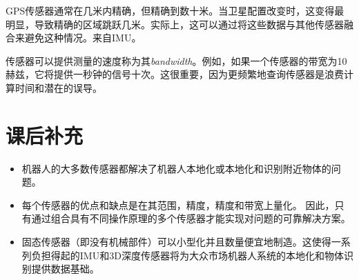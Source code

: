 

GPS传感器通常在几米内精确，但精确到数十米。当卫星配置改变时，这变得最明显，导致精确的区域跳跃几米。实际上，这可以通过将这些数据与其他传感器融合来避免这种情况。来自IMU。

传感器可以提供测量的速度称为其\emph{bandwidth}。例如，如果一个传感器的带宽为10赫兹，它将提供一秒钟的信号十次。这很重要，因为更频繁地查询传感器是浪费计算时间和潜在的误导。


\section*{课后补充}
\begin{itemize}

\item 机器人的大多数传感器都解决了机器人本地化或本地化和识别附近物体的问题。
\item 每个传感器的优点和缺点是在其范围，精度，精度和带宽上量化。 因此，只有通过组合具有不同操作原理的多个传感器才能实现对问题的可靠解决方案。
\item 固态传感器（即没有机械部件）可以小型化并且数量便宜地制造。这使得一系列负担得起的IMU和3D深度传感器将为大众市场机器人系统的本地化和物体识别提供数据基础。
\end{itemize} 

